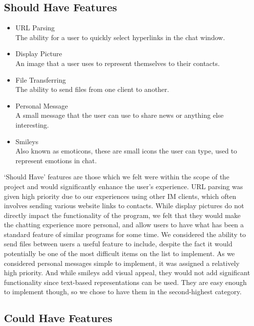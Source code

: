 \subsection*{Should Have Features}

\begin{itemize}
\item{URL Parsing\\
	The ability for a user to quickly select hyperlinks in the chat window.}
\item{Display Picture\\
	An image that a user uses to represent themselves to their contacts.}
\item{File Transferring\\
	The ability to send files from one client to another.}
\item{Personal Message\\
	A small message that the user can use to share news or anything else interesting.}
\item{Smileys\\
	Also known as emoticons, these are small icons the user can type, used to represent emotions in chat.}
\end{itemize}

`Should Have' features are those which we felt were within the scope of the project and would significantly enhance the user's experience. URL parsing was given high priority due to our experiences using other IM clients, which often involves sending various website links to contacts. While display pictures do not directly impact the functionality of the program, we felt that they would make the chatting experience more personal, and allow users to have what has been a standard feature of similar programs for some time. We considered the ability to send files between users a useful feature to include, despite the fact it would potentially be one of the most difficult items on the list to implement. As we considered personal messages simple to implement, it was assigned a relatively high priority. And while smileys add visual appeal, they would not add significant functionality since text-based representations can be used. They are easy enough to implement though, so we chose to have them in the second-highest category.


\subsection*{Could Have Features}

